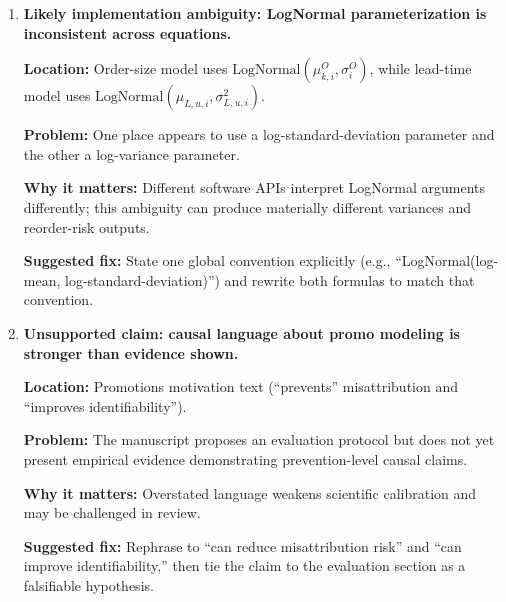 \documentclass[11pt]{article}
\begin{document}
\begin{enumerate}[leftmargin=*]
\textbf{Location:} State list and placement model ($\alpha_{k,i},\beta_{k,i}$ appear time-indexed), plus hyperparameter priors.

\textbf{Problem:} $\alpha_{k,i}$ and $\beta_{k,i}$ are indexed by $k$ but no transition model is provided; priors are given directly, which implies either independent per-interval coefficients or an incomplete specification.

\textbf{Why it matters:} This changes parameter count and identifiability substantially and can make implementations diverge in both complexity and behavior.

\textbf{Suggested fix:} Choose one explicit design: static coefficients ($\alpha_i,\beta_i$) or dynamic coefficients with stated transitions (e.g., random walk with shrinkage).

\item \textbf{Likely implementation ambiguity: LogNormal parameterization is inconsistent across equations.}

\textbf{Location:} Order-size model uses $\mathrm{LogNormal}(\mu^O_{k,i},\sigma^O_i)$, while lead-time model uses $\mathrm{LogNormal}(\mu_{L,u,i},\sigma^2_{L,u,i})$.

\textbf{Problem:} One place appears to use a log-standard-deviation parameter and the other a log-variance parameter.

\textbf{Why it matters:} Different software APIs interpret LogNormal arguments differently; this ambiguity can produce materially different variances and reorder-risk outputs.

\textbf{Suggested fix:} State one global convention explicitly (e.g., ``LogNormal(log-mean, log-standard-deviation)'') and rewrite both formulas to match that convention.

\item \textbf{Unsupported claim: causal language about promo modeling is stronger than evidence shown.}

\textbf{Location:} Promotions motivation text (``prevents'' misattribution and ``improves identifiability'').

\textbf{Problem:} The manuscript proposes an evaluation protocol but does not yet present empirical evidence demonstrating prevention-level causal claims.

\textbf{Why it matters:} Overstated language weakens scientific calibration and may be challenged in review.

\textbf{Suggested fix:} Rephrase to ``can reduce misattribution risk'' and ``can improve identifiability,'' then tie the claim to the evaluation section as a falsifiable hypothesis.

\end{enumerate}
\end{document}
